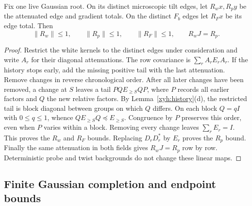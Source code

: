 \begin{lemma}\label{xyh:contraction}
Fix one live Gaussian root. On its distinct microscopic tilt edges, let
$R_wx,R_py$ be the attenuated
edge and gradient totals. On the distinct $F_b$ edges let $R_Fx$ be its
edge total. Then
\begin{equation}\label{xyh:contracting-maps}
 \|R_w\|\le1,\qquad\|R_p\|\le1,\qquad
 \|R_F\|\le1,\qquad R_wJ=R_p.
\end{equation}
\end{lemma}
\begin{proof}
Restrict the white kernels to the distinct edges under consideration and
write $A_r$ for their diagonal attenuations. The row covariance is
$\sum_rA_rE_rA_r$. If the history stops early, add the missing positive
tail with the last attenuation. Remove changes in reverse chronological
order. After all later changes have been removed, a change at $S$ leaves
a tail $P Q E_{\ge S}Q P$, where $P$ records all earlier factors and
$Q$ the new relative factors. By Lemma~\ref{xyh:history}(d), the restricted
tail is block diagonal between groups on which $Q$ differs. On each
block $Q=qI$ with $0\le q\le1$, whence
$QE_{\ge S}Q\preceq E_{\ge S}$. Congruence by $P$ preserves this order,
even when $P$ varies within a block. Removing every change leaves
$\sum_rE_r=I$. This proves the $R_w$ and $R_F$ bounds. Replacing
$D_rD_r^*$ by $E_r$ proves the $R_p$ bound. Finally the same attenuation
in both fields gives $R_wJ=R_p$ row by row. Deterministic probe and twist
backgrounds do not change these linear maps.
\end{proof}

\subsection{Finite Gaussian completion and endpoint bounds}


